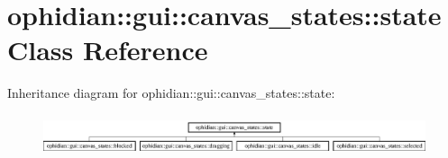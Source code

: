 \hypertarget{classophidian_1_1gui_1_1canvas__states_1_1state}{\section{ophidian\-:\-:gui\-:\-:canvas\-\_\-states\-:\-:state Class Reference}
\label{classophidian_1_1gui_1_1canvas__states_1_1state}
}
Inheritance diagram for ophidian\-:\-:gui\-:\-:canvas\-\_\-states\-:\-:state\-:\begin{figure}[H]
\begin{center}
\leavevmode
\includegraphics[height=1.201717cm]{classophidian_1_1gui_1_1canvas__states_1_1state}
\end{center}
\end{figure}
